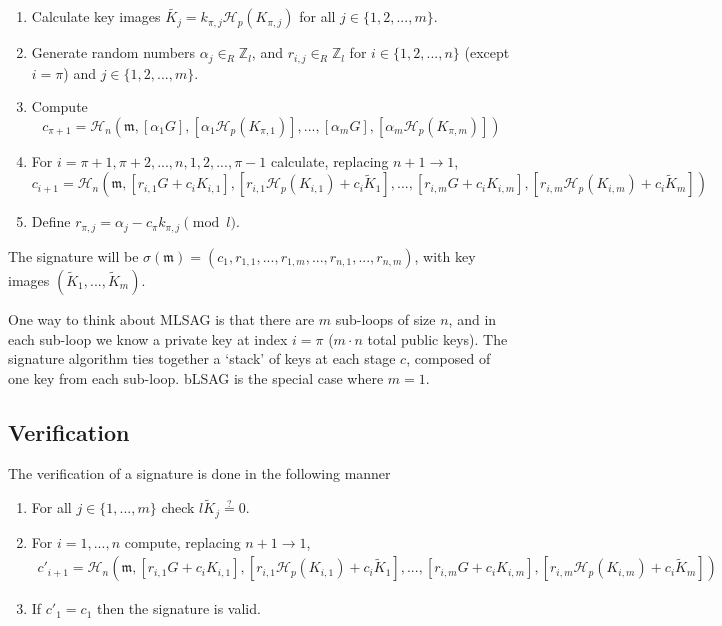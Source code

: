 \begin{enumerate}
	
	\item Calculate key images \(\tilde{K_j} = k_{\pi, j} \mathcal{H}_p(K_{\pi, j})\) for all \(j \in \{1, 2, ..., m\}\).
	
	\item Generate random numbers  \(\alpha_j \in_R \mathbb{Z}_l\), and \(r_{i, j} \in_R \mathbb{Z}_l\) for \(i \in \{1, 2, ..., n\}\) (except \(i = \pi\)) and \(j \in \{1, 2, ..., m\}\).
	
	\item Compute 
	\[
	c_{\pi+1} = \mathcal{H}_n(\mathfrak{m}, [\alpha_1 G], [\alpha_1 \mathcal{H}_p(K_{\pi, 1})], ..., [\alpha_m G], [\alpha_m \mathcal{H}_p(K_{\pi, m})])
	\]
	
	\item For \(i = \pi+1, \pi+2, ..., n, 1, 2, ..., \pi-1\) calculate, replacing \(n + 1 \rightarrow 1\),\\
	\[  c_{i+1} = \mathcal{H}_n(\mathfrak{m}, [r_{i, 1} G + c_i K_{i, 1}], [r_{i, 1} \mathcal{H}_p(K_{i, 1}) + c_i \tilde{K}_1], 
	..., [r_{i, m} G + c_i K_{i, m}], [r_{i, m} \mathcal{H}_p(K_{i, m}) + c_i \tilde{K}_m])  \] 
	
	
	\item Define \(r_{\pi, j} = \alpha_j - c_\pi k_{\pi, j} \pmod l\).
	
\end{enumerate}

The signature will be \(\sigma(\mathfrak{m}) = (c_1, r_{1, 1}, ..., r_{1, m}, ..., r_{n, 1}, ..., r_{n, m}) \), with key images $(\tilde{K}_1, ...,  \tilde{K}_m)$.

One way to think about MLSAG is that there are $m$ sub-loops of size $n$, and in each sub-loop we know a private key at index $i = \pi$ ($m \cdot n$ total public keys). The signature algorithm ties together a ‘stack’ of keys at each stage $c$, composed of one key from each sub-loop. bLSAG is the special case where $m = 1$.

\subsection*{Verification}

The verification of a signature is done in the following manner

\begin{enumerate}
    \item For all $j \in \{1,...,m\}$ check $l \tilde{K}_j \stackrel{?}{=} 0$.
	\item  For \(i = 1, ..., n\) compute, replacing \(n + 1 \rightarrow 1\),\\
	\begin{align*}
	c'_{i+1} = \mathcal{H}_n(\mathfrak{m}, [r_{i, 1} G + c_i K_{i, 1}], [r_{i, 1} \mathcal{H}_p(K_{i, 1}) + c_i \tilde{K}_1], 
	..., [r_{i, m} G + c_i K_{i, m}], [r_{i, m} \mathcal{H}_p(K_{i, m}) + c_i \tilde{K}_m]) 
	\end{align*}
	
	\item If \(c'_1 = c_1\) then the signature is valid.
\end{enumerate}


